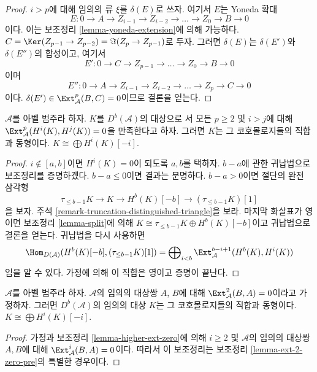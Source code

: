 \begin{proof}
$i > p$에 대해 임의의 류 $\xi$를 $\delta(E)$로 쓰자. 여기서 $E$는 Yoneda 확대
$$
E : 0 \to A \to Z_{i - 1} \to Z_{i - 2} \to \ldots \to Z_0 \to B \to 0
$$
이다. 이는 보조정리
\ref{lemma-yoneda-extension}에 의해 가능하다.
$C = \Ker(Z_{p - 1} \to Z_{p - 2}) = \Im(Z_p \to Z_{p - 1})$로 두자.
그러면 $\delta(E)$는 $\delta(E')$와 $\delta(E'')$의 합성이고, 여기서
$$
E' : 0 \to C \to Z_{p - 1} \to \ldots \to Z_0 \to B \to 0
$$
이며
$$
E'' : 0 \to A \to Z_{i - 1} \to Z_{i - 2} \to \ldots \to Z_p \to C \to 0
$$
이다. $\delta(E') \in \Ext^p_\mathcal{A}(B, C) = 0$이므로 결론을
얻는다.
\end{proof}

\begin{lemma}
\label{lemma-ext-2-zero-pre}
$\mathcal{A}$를 아벨 범주라 하자. $K$를 $D^b(\mathcal{A})$의 대상으로
서 모든 $p \geq 2$ 및 $i > j$에 대해
$\Ext^p_\mathcal{A}(H^i(K), H^j(K)) = 0$을 만족한다고 하자. 그러면
$K$는 그 코호몰로지들의 직합과 동형이다.
$K \cong \bigoplus H^i(K)[-i]$.
\end{lemma}

\begin{proof}
$i \not \in [a, b]$이면 $H^i(K) = 0$이 되도록 $a, b$를 택하자.
$b - a$에 관한 귀납법으로 보조정리를 증명하겠다. $b - a \leq 0$이면
결과는 분명하다. $b - a > 0$이면 절단의 완전 삼각형
$$
\tau_{\leq b - 1}K \to K \to H^b(K)[-b] \to (\tau_{\leq b - 1}K)[1]
$$
을 보자. 주석 \ref{remark-truncation-distinguished-triangle}을 보라.
마지막 화살표가 영이면 보조정리 \ref{lemma-split}에 의해
$K \cong \tau_{\leq b - 1}K \oplus H^b(K)[-b]$이고 귀납법으로
결론을 얻는다. 귀납법을 다시 사용하면
$$
\Hom_{D(\mathcal{A})}(H^b(K)[-b], (\tau_{\leq b - 1}K)[1]) =
\bigoplus\nolimits_{i < b} \Ext_\mathcal{A}^{b - i + 1}(H^b(K), H^i(K))
$$
임을 알 수 있다. 가정에 의해 이 직합은 영이고 증명이 끝난다.
\end{proof}

\begin{lemma}
\label{lemma-ext-2-zero}
$\mathcal{A}$를 아벨 범주라 하자. $\mathcal{A}$의 임의의 대상쌍
$A$, $B$에 대해 $\Ext^2_\mathcal{A}(B, A) = 0$이라고 가정하자.
그러면 $D^b(\mathcal{A})$의 임의의 대상 $K$는 그 코호몰로지들의
직합과 동형이다. $K \cong \bigoplus H^i(K)[-i]$.
\end{lemma}

\begin{proof}
가정과 보조정리 \ref{lemma-higher-ext-zero}에 의해 $i \geq 2$ 및
$\mathcal{A}$의 임의의 대상쌍 $A, B$에 대해
$\Ext^i_\mathcal{A}(B, A) = 0$이다. 따라서 이 보조정리는 보조정리
\ref{lemma-ext-2-zero-pre}의 특별한 경우이다.
\end{proof}

